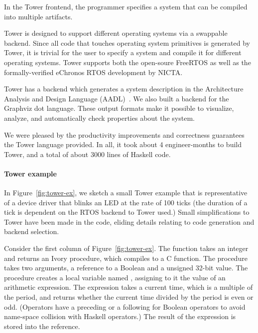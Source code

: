 In the Tower frontend, the programmer specifies a system that can be compiled into
multiple artifacts.

Tower is designed to support different operating systems via a swappable
backend. Since all code that touches operating system primitives is generated by
Tower, it is trivial for the user to specify a system and compile it for
different operating systems. Tower supports both the open-soure
FreeRTOS\cite{freertos} as well as the formally-verified
eChronos RTOS\cite{echronos} development by NICTA.


Tower has a backend which generates a system description in the Architecture
Analysis and Design Language (AADL)~\cite{SAE:AADL}. We also built a backend for
the Graphviz dot language.  These output formats make it possible to visualize,
analyze, and automatically check properties about the system.  %

We were pleased by the productivity improvements and correctness guarantees the
Tower language provided. In all, it took about 4 engineer-months to build Tower,
and a total of about 3000 lines of Haskell code.

\paragraph{Tower example}
In Figure~\ref{fig:tower-ex}, we sketch a small Tower example that is
representative of a device driver that blinks an LED at the rate of 100 ticks
(the duration of a tick is dependent on the RTOS backend to Tower used.)  Small
simplifications to Tower have been made in the code, eliding details relating to
code generation and backend selection.

Consider the first column of Figure~\ref{fig:tower-ex}.  The function takes an
integer and returns an Ivory procedure, which compiles to a C function.  The
procedure takes two arguments, a reference to a Boolean and a unsigned 32-bit
value.  The procedure creates a local variable named ,
assigning to it the value of an arithmetic expression.  The expression
takes a current time, which is a multiple of the period, and returns whether the
current time divided by the period is even or odd.  (Operators have a preceding
 or a following  for Boolean operators to avoid name-space collision
with Haskell operators.)  The result of the expression is stored into the
 reference.

